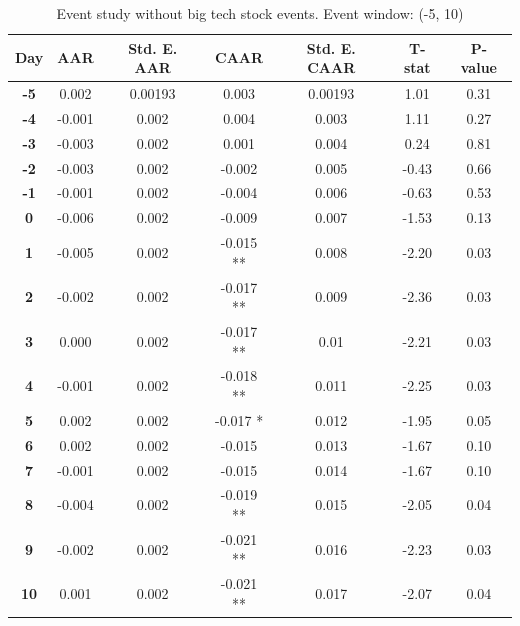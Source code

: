 \begin{table}[h]
    \centering
    \caption{Event study without big tech stock events. Event window: (-5, 10)}
    \label{tab:esNoBigTech}
    \begin{tabular}{|c|c|c|c|c|c|c|}
        \hline
        \textbf{Day} & \textbf{AAR} & \textbf{Std. E. AAR} & \textbf{CAAR} & \textbf{Std. E. CAAR} & \textbf{T-stat} & \textbf{P-value} \\
        \hline
        \textbf{-5} & 0.002 & 0.00193 & 0.003 & 0.00193 & 1.01 & 0.31 \\
        \hline
        \textbf{-4} & -0.001 & 0.002 & 0.004 & 0.003 & 1.11 & 0.27 \\
        \hline
        \textbf{-3} & -0.003 & 0.002 & 0.001 & 0.004 & 0.24 & 0.81 \\
        \hline
        \textbf{-2} & -0.003 & 0.002 & -0.002 & 0.005 & -0.43 & 0.66 \\
        \hline
        \textbf{-1} & -0.001 & 0.002 & -0.004 & 0.006 & -0.63 & 0.53 \\
        \hline
        \textbf{0} & -0.006 & 0.002 & -0.009 & 0.007 & -1.53 & 0.13 \\
        \hline
        \textbf{1} & -0.005 & 0.002 & -0.015 ** & 0.008 & -2.20 & 0.03 \\
        \hline
        \textbf{2} & -0.002 & 0.002 & -0.017 ** & 0.009 & -2.36 & 0.03 \\
        \hline
        \textbf{3} & 0.000 & 0.002 & -0.017 ** & 0.01 & -2.21 & 0.03 \\
        \hline
        \textbf{4} & -0.001 & 0.002 & -0.018 ** & 0.011 & -2.25 & 0.03 \\
        \hline
        \textbf{5} & 0.002 & 0.002 & -0.017 * & 0.012 & -1.95 & 0.05 \\
        \hline
        \textbf{6} & 0.002 & 0.002 & -0.015 & 0.013 & -1.67 & 0.10 \\
        \hline
        \textbf{7} & -0.001 & 0.002 & -0.015 & 0.014 & -1.67 & 0.10 \\
        \hline
        \textbf{8} & -0.004 & 0.002 & -0.019 ** & 0.015 & -2.05 & 0.04 \\
        \hline
        \textbf{9} & -0.002 & 0.002 & -0.021 ** & 0.016 & -2.23 & 0.03 \\
        \hline
        \textbf{10} & 0.001 & 0.002 & -0.021 ** & 0.017 & -2.07 & 0.04 \\
        \hline
    \end{tabular}
\end{table}

